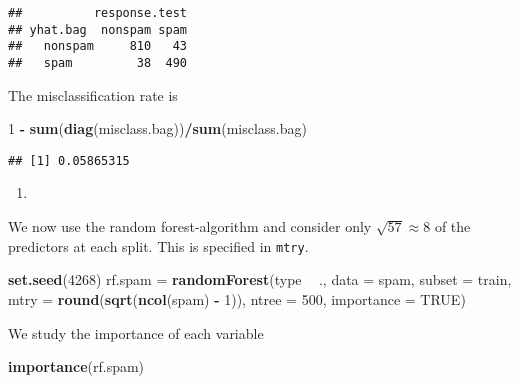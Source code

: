\documentclass[]{article}
\newenvironment{Shaded}{\begin{snugshade}}{\end{snugshade}}
\newcommand{\DataTypeTok}[1]{\textcolor[rgb]{0.13,0.29,0.53}{#1}}
\newcommand{\DecValTok}[1]{\textcolor[rgb]{0.00,0.00,0.81}{#1}}
\newcommand{\KeywordTok}[1]{\textcolor[rgb]{0.13,0.29,0.53}{\textbf{#1}}}
\newcommand{\NormalTok}[1]{#1}
\newcommand{\OperatorTok}[1]{\textcolor[rgb]{0.81,0.36,0.00}{\textbf{#1}}}
\newcommand{\OtherTok}[1]{\textcolor[rgb]{0.56,0.35,0.01}{#1}}
\newcommand{\StringTok}[1]{\textcolor[rgb]{0.31,0.60,0.02}{#1}}
\begin{document}
\begin{verbatim}
##          response.test
## yhat.bag  nonspam spam
##   nonspam     810   43
##   spam         38  490
\end{verbatim}

The misclassification rate is

\begin{Shaded}
\begin{Highlighting}[]
\DecValTok{1} \OperatorTok{-}\StringTok{ }\KeywordTok{sum}\NormalTok{(}\KeywordTok{diag}\NormalTok{(misclass.bag))}\OperatorTok{/}\KeywordTok{sum}\NormalTok{(misclass.bag)}
\end{Highlighting}
\end{Shaded}

\begin{verbatim}
## [1] 0.05865315
\end{verbatim}

\begin{enumerate}
\def\labelenumi{\alph{enumi})}
\setcounter{enumi}{6}
\item
\end{enumerate}

We now use the random forest-algorithm and consider only
\(\sqrt{57}\approx 8\) of the predictors at each split. This is
specified in \texttt{mtry}.

\begin{Shaded}
\begin{Highlighting}[]
\KeywordTok{set.seed}\NormalTok{(}\DecValTok{4268}\NormalTok{)}
\NormalTok{rf.spam =}\StringTok{ }\KeywordTok{randomForest}\NormalTok{(type }\OperatorTok{~}\StringTok{ }\NormalTok{., }\DataTypeTok{data =}\NormalTok{ spam, }\DataTypeTok{subset =}\NormalTok{ train, }\DataTypeTok{mtry =} \KeywordTok{round}\NormalTok{(}\KeywordTok{sqrt}\NormalTok{(}\KeywordTok{ncol}\NormalTok{(spam) }\OperatorTok{-}\StringTok{ }
\StringTok{    }\DecValTok{1}\NormalTok{)), }\DataTypeTok{ntree =} \DecValTok{500}\NormalTok{, }\DataTypeTok{importance =} \OtherTok{TRUE}\NormalTok{)}
\end{Highlighting}
\end{Shaded}

We study the importance of each variable

\begin{Shaded}
\begin{Highlighting}[]
\KeywordTok{importance}\NormalTok{(rf.spam)}
\end{Highlighting}
\end{Shaded}
\end{document}
